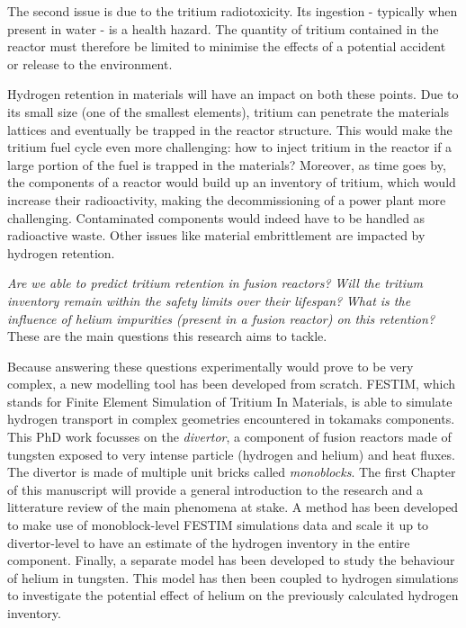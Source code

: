 The second issue is due to the tritium radiotoxicity.
Its ingestion - typically when present in water - is a health hazard.
The quantity of tritium contained in the reactor must therefore be limited to minimise the effects of a potential accident or release to the environment.

Hydrogen retention in materials will have an impact on both these points.
Due to its small size (one of the smallest elements), tritium can penetrate the materials lattices and eventually be trapped in the reactor structure.
This would make the tritium fuel cycle even more challenging: how to inject tritium in the reactor if a large portion of the fuel is trapped in the materials?
Moreover, as time goes by, the components of a reactor would build up an inventory of tritium, which would increase their radioactivity, making the decommissioning of a power plant more challenging.
Contaminated components would indeed have to be handled as radioactive waste.
Other issues like material embrittlement are impacted by hydrogen retention.

\emph{Are we able to predict tritium retention in fusion reactors?}\newline
\emph{Will the tritium inventory remain within the safety limits over their lifespan?}\newline
\emph{What is the influence of helium impurities (present in a fusion reactor) on this retention?}\newline
These are the main questions this research aims to tackle.

Because answering these questions experimentally would prove to be very complex, a new modelling tool has been developed from scratch.
FESTIM, which stands for Finite Element Simulation of Tritium In Materials, is able to simulate hydrogen transport in complex geometries encountered in tokamaks components.
This PhD work focusses on the \textit{divertor}, a component of fusion reactors made of tungsten exposed to very intense particle (hydrogen and helium) and heat fluxes. 
The divertor is made of multiple unit bricks called \textit{monoblocks}.
The first Chapter of this manuscript will provide a general introduction to the research and a litterature review of the main phenomena at stake.
A method has been developed to make use of monoblock-level FESTIM simulations data and scale it up to divertor-level to have an estimate of the hydrogen inventory in the entire component.
Finally, a separate model has been developed to study the behaviour of helium in tungsten.
This model has then been coupled to hydrogen simulations to investigate the potential effect of helium on the previously calculated hydrogen inventory.
